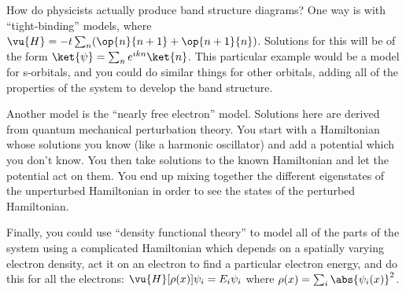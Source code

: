 \documentclass[a4paper,twoside,master.tex]{subfiles}
\begin{document}
\begin{note}
    How do physicists actually produce band structure diagrams? One way is with ``tight-binding'' models, where $ \vu{H} = -t \sum_n (\op{n}{n+1} + \op{n+1}{n}) $. Solutions for this will be of the form $\ket{\psi} = \sum_n e^{\imath k n}\ket{n} $. This particular example would be a model for s-orbitals, and you could do similar things for other orbitals, adding all of the properties of the system to develop the band structure.

    Another model is the ``nearly free electron'' model. Solutions here are derived from quantum mechanical perturbation theory. You start with a Hamiltonian whose solutions you know (like a harmonic oscillator) and add a potential which you don't know. You then take solutions to the known Hamiltonian and let the potential act on them. You end up mixing together the different eigenstates of the unperturbed Hamiltonian in order to see the states of the perturbed Hamiltonian.

    Finally, you could use ``density functional theory'' to model all of the parts of the system using a complicated Hamiltonian which depends on a spatially varying electron density, act it on an electron to find a particular electron energy, and do this for all the electrons: $ \vu{H} [\rho(x)] \psi_i = E_i \psi_i $ where $ \rho(x) = \sum_i \abs{\psi_i(x)}^2 $.
\end{note}
\end{document}
